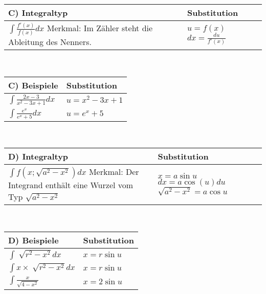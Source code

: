 \documentclass[../main.tex]{subfiles}
\begin{document}
\begin{tabularx}{0.9\textwidth} { 
    >{\centering\arraybackslash}X 
    >{\centering\arraybackslash}X  }
    \rowcolor{lightgray} C) Integraltyp & Substitution \\ [7pt]
    \hline
    $ \int \frac{f'(x)}{f(x)}dx$
    \newline \newline
    Merkmal: Im Zähler steht die Ableitung des Nenners.
    &
    $ u = f(x)$
    \newline 
    $ dx = \frac{du}{f'(x)}$
    \\ [7pt]
\end{tabularx}
\\ [7pt]

\begin{tabularx}{0.9\textwidth} { 
    >{\centering\arraybackslash}X 
    >{\centering\arraybackslash}X  }
    \rowcolor{lightgray} C) Beispiele & Substitution \\ [7pt]
    \hline
    $\int \frac{2x-3}{x^2-3x+1}dx$ & $ u = x^2-3x+1$
    \\ [7pt]
    $ \int \frac{e^x}{e^x+5}dx$ & $u=e^x+5$
    \\ [7pt]
\end{tabularx}
\\ [7pt]

\begin{tabularx}{0.9\textwidth} { 
    >{\centering\arraybackslash}X 
    >{\centering\arraybackslash}X  }
    \rowcolor{lightgray} D) Integraltyp & Substitution \\ [7pt]
    \hline
    $ \int f(x; \sqrt{a^2-x^2})dx$
    \newline \newline
    Merkmal: Der Integrand enthält eine Wurzel vom Typ $\sqrt{a^2-x^2}$
    &
    $x=a \sin u$
    \newline 
    $ dx = a\cos (u) du$
    \newline 
    $\sqrt{a^2-x^2} = a \cos u$
    \\ [7pt]
\end{tabularx}
\\ [7pt]

\begin{tabularx}{0.9\textwidth} { 
    >{\centering\arraybackslash}X 
    >{\centering\arraybackslash}X  }
    \rowcolor{lightgray} D) Beispiele & Substitution \\ [7pt]
    \hline
    $\int \sqrt[]{r^2-x^2}dx$ & $x =r \sin u $
    \\ [7pt]
    $\int x \times \sqrt[]{r^2-x^2}dx $ & $x=r \sin u$
    \\ [7pt]
    $\int \frac{x}{\sqrt{4-x^2}} $ & $x=2\sin u$
    \\ [7pt]
\end{tabularx}
\\ [7pt]
\end{document}
